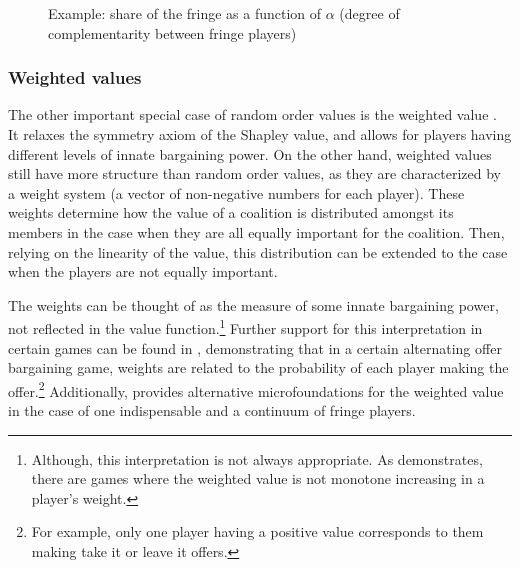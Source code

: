 \documentclass[a4paper]{article}
\begin{document}
\begin{figure}
    \centering
    \caption{Example: share of the fringe as a function of $\alpha$ (degree of complementarity between fringe players)}
    \label{fig:power_function_example}
\end{figure}


\subsubsection{Weighted values}
\label{sec:weighted_one_sided}

The other important special case of random order values is the weighted value \parencite{shapley1953additive}.
It relaxes the symmetry axiom of the Shapley value, and allows for players having different levels of innate bargaining power.
On the other hand, weighted values still have more structure than random order values, as they are characterized by a weight system (a vector of non-negative numbers for each player).
These weights determine how the value of a coalition is distributed amongst its members in the case when they are all equally important for the coalition.
Then, relying on the linearity of the value, this distribution can be extended to the case when the players are not equally important.

The weights can be thought of as the measure of some innate bargaining power, not reflected in the value function.\footnote{
    Although, this interpretation is not always appropriate.
    As \textcite{owen1968communications} demonstrates, there are games where the weighted value is not monotone increasing in a player's weight.
}
Further support for this interpretation in certain games can be found in \textcite{hart1996bargaining}, demonstrating that in a certain alternating offer bargaining game, weights are related to the probability of each player making the offer.\footnote{
    For example, only one player having a positive value corresponds to them making take it or leave it offers.
}
Additionally, \textcite{stole1996intra} provides alternative microfoundations for the weighted value in the case of one indispensable and a continuum of fringe players.
\end{document}
